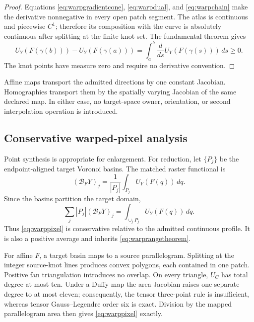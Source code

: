 \documentclass[journal]{IEEEtran}
\begin{document}
\begin{proof}
Equations \eqref{eq:warpgradientcone}, \eqref{eq:warpdual}, and
\eqref{eq:warpchain} make the derivative nonnegative in every open patch
segment.  The atlas is continuous and piecewise \(C^1\); therefore its
composition with the curve is absolutely continuous after splitting at the
finite knot set.  The fundamental theorem gives
\begin{equation}
 U_Y(F(\gamma(b)))-U_Y(F(\gamma(a)))
 =\int_a^b\frac{d}{ds}U_Y(F(\gamma(s)))\,ds\geq0.
\end{equation}
The knot points have measure zero and require no derivative convention.
\end{proof}

Affine maps transport the admitted directions by one constant Jacobian.
Homographies transport them by the spatially varying Jacobian of the same
declared map.  In either case, no target-space owner, orientation, or second
interpolation operation is introduced.

\subsection{Conservative warped-pixel analysis}

Point synthesis is appropriate for enlargement.  For reduction, let
\(\{P_j\}\) be the endpoint-aligned target Voronoi basins.  The matched
raster functional is
\begin{equation}
 (\mathcal B_FY)_j=
 \frac{1}{|P_j|}\int_{P_j}U_Y(F(q))\,dq.
 \label{eq:warppixel}
\end{equation}
Since the basins partition the target domain,
\begin{equation}
 \sum_j|P_j|(\mathcal B_FY)_j
 =\int_{\cup_jP_j}U_Y(F(q))\,dq.
 \label{eq:warpconservation}
\end{equation}
Thus \eqref{eq:warppixel} is conservative relative to the admitted continuous
profile.  It is also a positive average and inherits
\eqref{eq:warprangetheorem}.

For affine \(F\), a target basin maps to a source parallelogram.  Splitting
at the integer source-knot lines produces convex polygons, each contained in
one patch.  Positive fan triangulation introduces no overlap.  On every
triangle, \(U_C\) has total degree at most ten.  Under a Duffy map the area
Jacobian raises one separate degree to at most eleven; consequently, the
tensor three-point rule is insufficient, whereas tensor Gauss--Legendre
order six is exact.  Division by the mapped parallelogram area then gives
\eqref{eq:warppixel} exactly.
\end{document}
